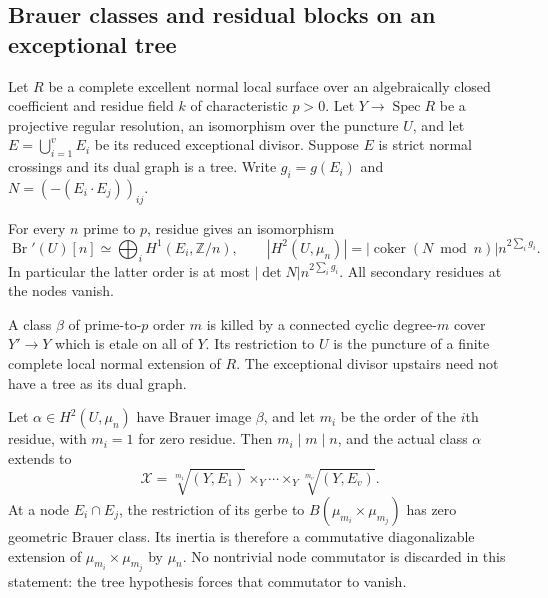 \subsection{Brauer classes and residual blocks on an exceptional tree}

\begin{lemma}
\label{D:SNC-tree-Brauer-geometry}
Let $R$ be a complete excellent normal local surface over an
algebraically closed coefficient and residue field $k$ of
characteristic $p>0$. Let $Y\to\operatorname{Spec}R$ be a
projective regular resolution, an isomorphism over the puncture
$U$, and let $E=\bigcup_{i=1}^v E_i$ be its reduced exceptional
divisor. Suppose $E$ is strict normal crossings and its dual
graph is a tree. Write $g_i=g(E_i)$ and
$N=(-(E_i\cdot E_j))_{ij}$.

For every $n$ prime to $p$, residue gives an isomorphism
\[
 \operatorname{Br}'(U)[n]\simeq
       \bigoplus_i H^1(E_i,\mathbb Z/n),\qquad
 |H^2(U,\mu_n)|=|\operatorname{coker}(N\bmod n)|
                             n^{2\sum_i g_i}.           \tag{D.TR.1}
\]
In particular the latter order is at most
$|\det N|n^{2\sum_i g_i}$. All secondary residues at the
nodes vanish.

A class $\beta$ of prime-to-$p$ order $m$ is killed by a
connected cyclic degree-$m$ cover $Y'\to Y$ which is etale
on all of $Y$. Its restriction to $U$ is the puncture of a
finite complete local normal extension of $R$. The exceptional
divisor upstairs need not have a tree as its dual graph.

Let $\alpha\in H^2(U,\mu_n)$ have Brauer image $\beta$,
and let $m_i$ be the order of the $i$th residue, with
$m_i=1$ for zero residue. Then $m_i\mid m\mid n$, and
the actual class $\alpha$ extends to
\[
       \mathcal X=\sqrt[m_1]{(Y,E_1)}\times_Y\cdots
                         \times_Y\sqrt[m_v]{(Y,E_v)}.  \tag{D.TR.2}
\]
At a node $E_i\cap E_j$, the restriction of its gerbe to
$B(\mu_{m_i}\times\mu_{m_j})$ has zero geometric Brauer
class. Its inertia is therefore a commutative diagonalizable
extension of $\mu_{m_i}\times\mu_{m_j}$ by $\mu_n$.
No nontrivial node commutator is discarded in this statement:
the tree hypothesis forces that commutator to vanish.
\end{lemma}

